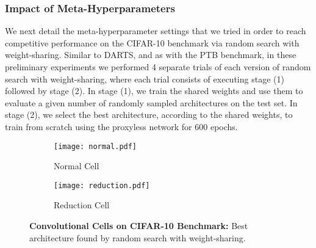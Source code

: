 \documentclass[acmlarge, nonacm]{acmart}
\begin{document}
\subsubsection{Impact of Meta-Hyperparameters}
\label{ssec:cnn_search}
We next detail the meta-hyperparameter settings that we tried in order to reach competitive performance on the CIFAR-10 benchmark via random search with weight-sharing.
Similar to DARTS, and as with the PTB benchmark, in these preliminary experiments we performed 4 separate trials of each version of random search with weight-sharing, where each trial consists of executing stage (1) followed by stage (2). In stage (1), we train the shared weights and use them to evaluate a given number of randomly sampled architectures on the test set.  In stage (2), we select the best architecture, according to the shared weights, to train from scratch using the proxyless network for 600 epochs. 

\begin{figure}[t]
    \centering
    \begin{subfigure}[b]{0.45\textwidth}
        \texttt{[image: normal.pdf]}
        \caption{Normal Cell}
    \end{subfigure}
    \begin{subfigure}[b]{0.45\textwidth}
        \texttt{[image: reduction.pdf]}
        \caption{Reduction Cell}
    \end{subfigure}
    \caption{\textbf{Convolutional Cells on CIFAR-10 Benchmark:} Best architecture found by random search with weight-sharing.}
    \label{fig:cnn_cell}
\end{figure}
\end{document}
